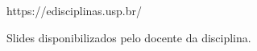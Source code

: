 \begin{thebibliography}{}
\bibitem[1]{}
https://edisciplinas.usp.br/

\bibitem[2]{}
Slides disponibilizados pelo docente da disciplina.
\end{thebibliography}
